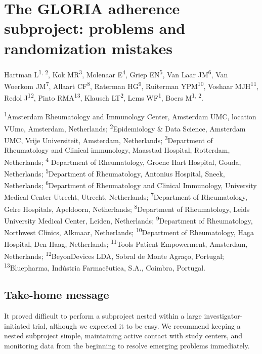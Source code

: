 \documentclass{article}
\begin{document}
  \section{The GLORIA adherence subproject: problems and randomization mistakes}

Hartman L\textsuperscript{1, 2}, Kok MR\textsuperscript{3}, Molenaar E\textsuperscript{4}, Griep EN\textsuperscript{5}, Van Laar JM\textsuperscript{6}, Van Woerkom JM\textsuperscript{7}, Allaart CF\textsuperscript{8}, Raterman HG\textsuperscript{9}, Ruiterman YPM\textsuperscript{10}, Voshaar MJH\textsuperscript{11}, Redol J\textsuperscript{12}, Pinto RMA\textsuperscript{13}, Klausch LT\textsuperscript{2}, Lems WF\textsuperscript{1}, Boers M\textsuperscript{1, 2}.



\textsuperscript{1}Amsterdam Rheumatology and Immunology Center, Amsterdam UMC, location VUmc, Amsterdam, Netherlands; \textsuperscript{2}Epidemiology \& Data Science, Amsterdam UMC, Vrije Universiteit, Amsterdam, Netherlands; \textsuperscript{3}Department of Rheumatology and Clinical immunology, Maasstad Hospital, Rotterdam, Netherlands;\textsuperscript{ 4} Department of Rheumatology, Groene Hart Hospital, Gouda, Netherlands; \textsuperscript{5}Department of Rheumatology, Antonius Hospital, Sneek, Netherlands; \textsuperscript{6}Department of Rheumatology and Clinical Immunology, University Medical Center Utrecht, Utrecht, Netherlands; \textsuperscript{7}Department of Rheumatology, Gelre Hospitals, Apeldoorn, Netherlands; \textsuperscript{8}Department of Rheumatology, Leids University Medical Center, Leiden, Netherlands; \textsuperscript{9}Department of Rheumatology, Northwest Clinics, Alkmaar, Netherlands;\textsuperscript{ 10}Department of Rheumatology, Haga Hospital, Den Haag, Netherlands; \textsuperscript{11}Tools Patient Empowerment, Amsterdam, Netherlands; \textsuperscript{12}BeyonDevices LDA, Sobral de Monte Agraço, Portugal; \textsuperscript{13}Bluepharma, Indústria Farmacêutica, S.A., Coimbra, Portugal.



\subsection{Take-home message}

It proved difficult to perform a subproject nested within a large investigator-initiated trial, although we expected it to be easy. We recommend keeping a nested subproject simple, maintaining active contact with study centers, and monitoring data from the beginning to resolve emerging problems immediately. 
\end{document}
